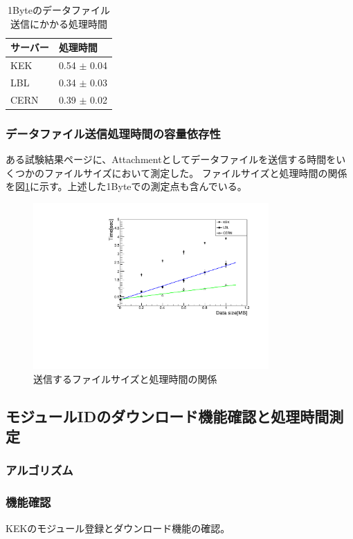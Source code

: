 \begin{table}[tbp]
\begin{center}
\caption[1Byteのデータファイル送信にかかる処理時間]{1Byteのデータファイル送信にかかる処理時間}
\label{sendpd_1byte}
  \begin{tabular}{|ll|} \hline
    サーバー & 処理時間 \\ \hline
    KEK & 0.54 $\pm$ 0.04 \\ 
    LBL & 0.34 $\pm$ 0.03 \\ 
    CERN & 0.39 $\pm$ 0.02 \\ \hline 
  \end{tabular}
\end{center}
\end{table}

\subsubsection{データファイル送信処理時間の容量依存性}
ある試験結果ページに、Attachmentとしてデータファイルを送信する時間をいくつかのファイルサイズにおいて測定した。
ファイルサイズと処理時間の関係を図\ref{datasize_vs_time}に示す。上述した1Byteでの測定点も含んでいる。
\begin{figure}[bpt]\centering
\includegraphics[width=9cm,angle=270]{datasize_vs_time.pdf}
\caption[送信するファイルサイズと処理時間の関係]{送信するファイルサイズと処理時間の関係}
\label{datasize_vs_time}
\end{figure}

\subsection{モジュールIDのダウンロード機能確認と処理時間測定}
\subsubsection{アルゴリズム}
\subsubsection{機能確認}
KEKのモジュール登録とダウンロード機能の確認。
